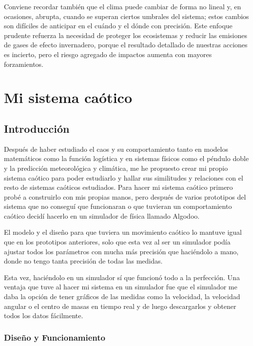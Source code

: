 \documentclass[
  10pt,
  a4paper,
  DIV=11,
  numbers=noendperiod,
  open=any]{scrreprt}
\numberwithin{equation}{chapter}
\numberwithin{equation}{section}
\renewcommand{\[}{\begin{equation}}
\renewcommand{\]}{\end{equation}}
\begin{document}
Conviene recordar también que el clima puede cambiar de forma no lineal
y, en ocasiones, abrupta, cuando se superan ciertos umbrales del
sistema; estos cambios son difíciles de anticipar en el cuándo y el
dónde con precisión. Este enfoque prudente refuerza la necesidad de
proteger los ecosistemas y reducir las emisiones de gases de efecto
invernadero, porque el resultado detallado de nuestras acciones es
incierto, pero el riesgo agregado de impactos aumenta con mayores
forzamientos.

\part{Mi sistema caótico}

\chapter{Introducción}\label{introducciuxf3n-6}

Después de haber estudiado el caos y su comportamiento tanto en modelos
matemáticos como la función logística y en sistemas físicos como el
péndulo doble y la predicción meteorológica y climática, me he propuesto
crear mi propio sistema caótico para poder estudiarlo y hallar sus
similitudes y relaciones con el resto de sistemas caóticos estudiados.
Para hacer mi sistema caótico primero probé a construirlo con mis
propias manos, pero después de varios prototipos del sistema que no
conseguí que funcionaran o que tuvieran un comportamiento caótico decidí
hacerlo en un simulador de física llamado Algodoo.

El modelo y el diseño para que tuviera un movimiento caótico lo mantuve
igual que en los prototipos anteriores, solo que esta vez al ser un
simulador podía ajustar todos los parámetros con mucha más precisión que
haciéndolo a mano, donde no tengo tanta precisión de todas las medidas.

Esta vez, haciéndolo en un simulador sí que funcionó todo a la
perfección. Una ventaja que tuve al hacer mi sistema en un simulador fue
que el simulador me daba la opción de tener gráficos de las medidas como
la velocidad, la velocidad angular o el centro de masas en tiempo real y
de luego descargarlos y obtener todos los datos fácilmente.

\section{Diseño y Funcionamiento}\label{diseuxf1o-y-funcionamiento}
\end{document}
